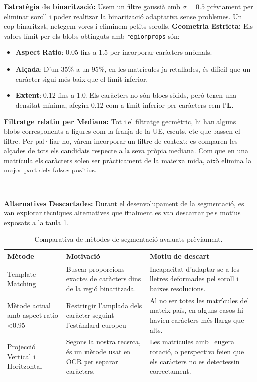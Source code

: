\textbf{Estratègia de binarització:}
Usem un filtre gaussià amb $\sigma=0.5$ prèviament per eliminar soroll i poder realitzar la binarització adaptativa sense problemes. Un cop binaritzat, netegem vores i eliminem petits sorolls.
\textbf{Geometria Estricta:}
Els valors límit per els blobs obtinguts amb \texttt{regionprops} són:
\begin{itemize}
    \item \textbf{Aspect Ratio}: 0.05 fins a 1.5 per incorporar caràcters anòmals.
    \item \textbf{Alçada}: D'un 35\% a un 95\%, en les matrícules ja retallades, és difícil que un caràcter sigui més baix que el límit inferior.
    \item \textbf{Extent}: 0.12 fins a 1.0. Els caràcters no són blocs sòlids, però tenen una densitat mínima, afegim 0.12 com a límit inferior per caràcters com l'\textbf{L}.
\end{itemize}
\textbf{Filtratge relatiu per Mediana:}
Tot i el filtratge geomètric, hi han alguns blobs corresponents a figures com la franja de la UE, escuts, etc que passen el filtre. Per pal·liar-ho, vàrem incorporar un filtre de context: es comparen les alçades de tots els candidats respecte a la seva pròpia mediana. Com que en una matrícula els caràcters solen ser pràcticament de la mateixa mida, això elimina la major part dels falsos positius.

\

\textbf{Alternatives Descartades:}
Durant el desenvolupament de la segmentació, es van explorar tècniques alternatives que finalment es van descartar pels motius exposats a la taula \ref{tab:segment_alternatives}.

\begin{table}[H]
    \centering
    \begin{tabular}{|p{3cm}|p{4cm}|p{7cm}|}
        \hline
        \textbf{Mètode} & \textbf{Motivació} & \textbf{Motiu de descart} \\
        \hline
        Template Matching & Buscar proporcions exactes de caràcters dins de la regió binaritzada. & Incapacitat d'adaptar-se a les lletres deformades pel soroll i baixes resolucions.\\
        \hline
        Mètode actual amb aspect ratio <0.95 & Restringir l'amplada dels caràcter seguint l'estàndard europeu & Al no ser totes les matrícules del mateix país, en alguns casos hi havien caràcters més llargs que alts.\\
        \hline
        Projecció Vertical i Horitzontal & Segons la nostra recerca, és un mètode usat en OCR per separar caràcters. & Les matrícules amb lleugera rotació, o perspectiva feien que els caràcters no es detectessin correctament.\\
        \hline
    \end{tabular}
    \caption{Comparativa de mètodes de segmentació avaluats prèviament.}
    \label{tab:segment_alternatives}
\end{table}

